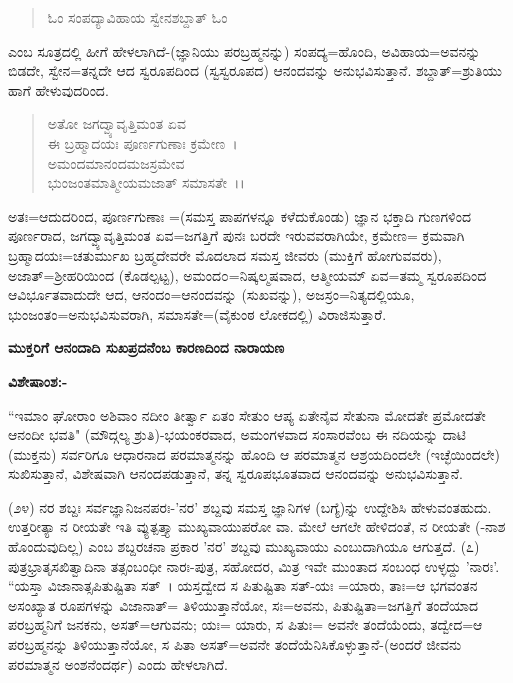 \begin{verse}
ಓಂ ಸಂಪದ್ಯಾವಿಹಾಯ ಸ್ವೇನಶಬ್ದಾತ್ ಓಂ
\end{verse}


\noindent
ಎಂಬ ಸೂತ್ರದಲ್ಲಿ ಹೀಗೆ ಹೇಳಲಾಗಿದೆ-(ಜ್ಞಾನಿಯು ಪರಬ್ರಹ್ಮನನ್ನು) ಸಂಪದ್ಯ=ಹೊಂದಿ, ಅವಿಹಾಯ=ಅವನನ್ನು ಬಿಡದೇ, ಸ್ವೇನ=ತನ್ನದೇ ಆದ ಸ್ವರೂಪದಿಂದ (ಸ್ವಸ್ವರೂಪದ) ಆನಂದವನ್ನು ಅನುಭವಿಸುತ್ತಾನೆ. ಶಬ್ದಾತ್=ಶ್ರುತಿಯು ಹಾಗೆ ಹೇಳುವುದರಿಂದ.

\begin{verse}
ಅತೋ ಜಗದ್ವ್ಯಾವೃತ್ತಿಮಂತ ಏವ\\ ಈ ಬ್ರಹ್ಮಾದಯಃ ಪೂರ್ಣಗುಣಾಃ ಕ್ರಮೇಣ~।\\ ಅಮಂದಮಾನಂದಮಜಸ್ರಮೇವ\\ ಭುಂಜಂತಮಾತ್ಮೀಯಮಜಾತ್ ಸಮಾಸತೇ~।।
\end{verse}

ಅತಃ=ಆದುದರಿಂದ, ಪೂರ್ಣಗುಣಾಃ =(ಸಮಸ್ತ ಪಾಪಗಳನ್ನೂ ಕಳೆದುಕೊಂಡು) ಜ್ಞಾನ ಭಕ್ತಾದಿ ಗುಣಗಳಿಂದ ಪೂರ್ಣರಾದ, ಜಗದ್ವ್ಯಾವೃತ್ತಿಮಂತ ಏವ=ಜಗತ್ತಿಗೆ ಪುನಃ ಬರದೇ ಇರುವವರಾಗಿಯೇ, ಕ್ರಮೇಣ= ಕ್ರಮವಾಗಿ ಬ್ರಹ್ಮಾದಯಃ=ಚತುರ್ಮುಖ ಬ್ರಹ್ಮದೇವರೇ ಮೊದಲಾದ ಸಮಸ್ತ ಜೀವರು (ಮುಕ್ತಿಗೆ ಹೋಗುವವರು), ಅಜಾತ್=ಶ‍್ರೀಹರಿಯಿಂದ (ಕೊಡಲ್ಪಟ್ಟ), ಅಮಂದ೦=ನಿಷ್ಕಲ್ಮಷವಾದ, ಆತ್ಮೀಯಮ್ ಏವ=ತಮ್ಮ ಸ್ವರೂಪದಿಂದ ಆವಿರ್ಭೂತವಾದುದೇ ಆದ, ಆನಂದಂ=ಆನಂದವನ್ನು (ಸುಖವನ್ನು), ಅಜಸ್ರಂ=ನಿತ್ಯದಲ್ಲಿಯೂ, ಭುಂಜಂತಂ=ಅನುಭವಿಸುವರಾಗಿ, ಸಮಾಸತೇ=(ವೈಕುಂಠ ಲೋಕದಲ್ಲಿ) ವಿರಾಜಿಸುತ್ತಾರೆ.

\begin{center}
\textbf{ಮುಕ್ತರಿಗೆ ಆನಂದಾದಿ ಸುಖಪ್ರದನೆಂಬ ಕಾರಣದಿಂದ ನಾರಾಯಣ}
\end{center}

\noindent
\textbf{ವಿಶೇಷಾಂಶ:-}

``ಇಮಾಂ ಘೋರಾಂ ಅಶಿವಾಂ ನದೀಂ ತೀರ್ತ್ವಾ ಏತಂ ಸೇತುಂ ಆಪ್ಯ ಏತೇನೈವ ಸೇತುನಾ ಮೋದತೇ ಪ್ರಮೋದತೇ ಆನಂದೀ ಭವತಿ" (ಮೌದ್ಗಲ್ಯ ಶ್ರುತಿ)-ಭಯಂಕರವಾದ, ಅಮಂಗಳವಾದ ಸಂಸಾರವೆಂಬ ಈ ನದಿಯನ್ನು ದಾಟಿ (ಮುಕ್ತನು) ಸರ್ವರಿಗೂ ಆಧಾರನಾದ ಪರಮಾತ್ಮನನ್ನು ಹೊಂದಿ ಆ ಪರಮಾತ್ಮನ ಆಶ್ರಯದಿಂದಲೇ (ಇಚ್ಛೆಯಿಂದಲೇ) ಸುಖಿಸುತ್ತಾನೆ, ವಿಶೇಷವಾಗಿ ಆನಂದಪಡುತ್ತಾನೆ, ತನ್ನ ಸ್ವರೂಪಭೂತವಾದ ಆನಂದವನ್ನು ಅನುಭವಿಸುತ್ತಾನೆ.

(೨೪) ನರ ಶಬ್ದಃ ಸರ್ವಜ್ಞಾನಿಜನಪರಃ-'ನರ' ಶಬ್ದವು ಸಮಸ್ತ ಜ್ಞಾನಿಗಳ (ಬಗ್ಯೆ)ನ್ನು ಉದ್ದೇಶಿಸಿ ಹೇಳುವಂತಹುದು. ಉತ್ತರೀತ್ಯಾ ನ ರೀಯತೇ ಇತಿ ವ್ಯುತ್ಪತ್ತ್ಯಾ ಮುಖ್ಯವಾಯುಪರೋ ವಾ. ಮೇಲೆ ಆಗಲೇ ಹೇಳಿದಂತೆ, ನ ರೀಯತೇ (-ನಾಶ ಹೊಂದುವುದಿಲ್ಲ) ಎಂಬ ಶಬ್ದರಚನಾ ಪ್ರಕಾರ 'ನರ' ಶಬ್ದವು ಮುಖ್ಯವಾಯು ಎಂಬುದಾಗಿಯೂ ಆಗುತ್ತದೆ. (೭) ಪುತ್ರಭ್ರಾತೃಸಖಿತ್ವಾದಿನಾ ತತ್ಸಂಬಂಧೀ ನಾರಃ-ಪುತ್ರ, ಸಹೋದರ, ಮಿತ್ರ ಇವೇ ಮುಂತಾದ ಸಂಬಂಧ ಉಳ್ಳದ್ದು 'ನಾರಃ'. ``ಯಸ್ತಾ ವಿಜಾನಾತ್ಸಪಿತುಷ್ಟಿತಾ ಸತ್~। ಯಸ್ತದ್ವೇದ ಸ ಪಿತುಷ್ಟಿತಾ ಸತ್-ಯಃ =ಯಾರು, ತಾಃ=ಆ ಭಗವಂತನ ಅಸಂಖ್ಯಾತ ರೂಪಗಳನ್ನು ವಿಜಾನಾತ್= ತಿಳಿಯುತ್ತಾನೆಯೋ, ಸಃ=ಅವನು, ಪಿತುಷ್ಟಿತಾ=ಜಗತ್ತಿಗೆ ತಂದೆಯಾದ ಪರಬ್ರಹ್ಮನಿಗೆ ಜನಕನು, ಅಸತ್=ಆಗುವನು; ಯಃ= ಯಾರು, ಸ ಪಿತುಃ= ಅವನೇ ತಂದೆಯೆಂದು, ತದ್ವೇದ=ಆ ಪರಬ್ರಹ್ಮನನ್ನು ತಿಳಿಯುತ್ತಾನೆಯೋ, ಸ ಪಿತಾ ಅಸತ್=ಅವನೇ ತಂದೆಯೆನಿಸಿಕೊಳ್ಳುತ್ತಾನೆ-(ಅಂದರೆ ಜೀವನು ಪರಮಾತ್ಮನ ಅಂಶನೆಂದರ್ಥ) ಎಂದು ಹೇಳಲಾಗಿದೆ.

